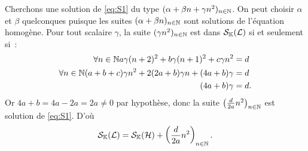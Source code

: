 \begin{itemize}
\begin{itemize}
        Cherchons une solution de \eqref{eq:S1} du type \((\alpha+\beta n + \gamma n^2)_{n \in \mathbb{N}}\). On peut choisir \(\alpha\) et \(\beta\) quelconques puisque les suites \((\alpha+\beta n)_{n \in \mathbb{N}}\) sont solutions de l'équation homogène. Pour tout scalaire \(\gamma\), la suite \((\gamma n^2)_{n \in \mathbb{N}}\) est dans \(\mathcal{S}_{\mathbb{K}}(\mathcal{L})\) si et seulement si~:
        \begin{align}
          \forall n \in \mathbb{N} a\gamma(n+2)^2 +b\gamma(n+1)^2 +c\gamma n^2 &=d\\
          \forall n \in \mathbb{N} (a+b+c)\gamma n^2 +2(2a+b)\gamma n +(4a+b)\gamma &=d \\
          (4a+b)\gamma &=d.
        \end{align}
        Or \(4a+b=4a-2a=2a \neq 0\) par hypothèse, donc la suite \(\left(\frac{d}{2a} n^2\right)_{n \in \mathbb{N}}\) est solution de \eqref{eq:S1}. D'où
        \begin{equation}
          \mathcal{S}_{\mathbb{K}}(\mathcal{L}) = \mathcal{S}_{\mathbb{K}}(\mathcal{H}) + \left(\frac{d}{2a} n^2\right)_{n \in \mathbb{N}}.
        \end{equation}
    \end{itemize}
\end{itemize}
